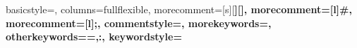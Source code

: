 {
    basicstyle=\ttfamily\small,
    columns=fullflexible,
    morecomment=[s][\color{olive}\bfseries]{[}{]},
    morecomment=[l]{\#},
    morecomment=[l]{;},
    commentstyle=\color{gray}\ttfamily,
    morekeywords={},
    otherkeywords={=,:},
    keywordstyle={\color{black}\bfseries}
}
